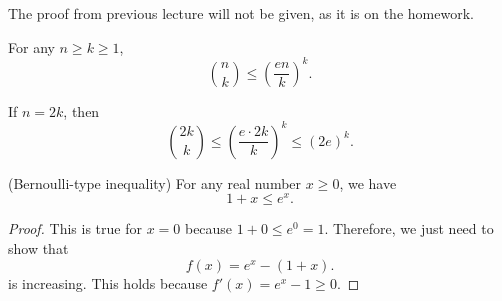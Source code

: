 
The proof from previous lecture will not be given, as it is on the homework.

\begin{lemma}
	For any \( n\ge k\ge 1 \), \[
		\binom{n}{k} \le \left( \frac{en}{k} \right) ^{k} 
	.\] 
\end{lemma}

\begin{observation}
	If \( n=2k \), then \[
		\binom{2k}{k} \le \left( \frac{e\cdot 2k}{k} \right)^{k}  \le (2e)^{k} 
	.\] 
\end{observation}

\begin{lemma}
	(Bernoulli-type inequality) For any real number \( x\ge 0 \), we have \[
		1 + x \le e^{x} 
	.\] 
\end{lemma}
\begin{proof}
	This is true for \( x=0 \) because \( 1 + 0 \le e^{0} = 1 \). Therefore, we just need to show that \[
		f(x) = e^{x} - (1+x) 
	.\] is increasing. This holds because \( f'(x) = e^{x}-1\ge 0  \).
\end{proof}
